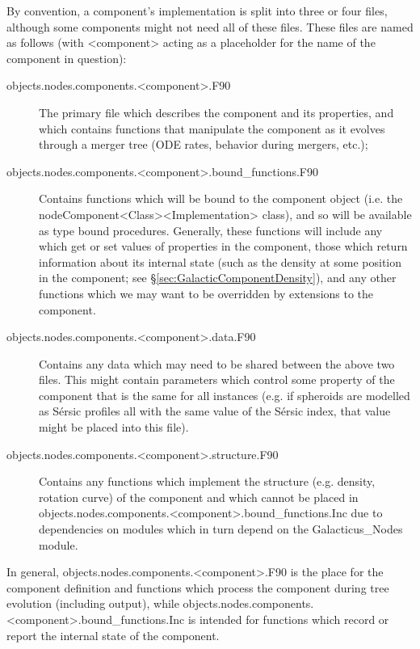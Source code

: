 By convention, a component's implementation is split into three or four files, although some components might not need all of these files. These files are named as follows (with {\normalfont \ttfamily \textless component\textgreater} acting as a placeholder for the name of the component in question):
\begin{description}
 \item [{\normalfont \ttfamily objects.nodes.components.\textless component\textgreater.F90}] The primary file which describes the component and its properties, and which contains functions that manipulate the component as it evolves through a merger tree (ODE rates, behavior during mergers, etc.);
 \item [{\normalfont \ttfamily objects.nodes.components.\textless component\textgreater.bound\_functions.F90}] Contains functions which will be bound to the component object (i.e. the {\normalfont \ttfamily nodeComponent\textless Class\textgreater\textless Implementation\textgreater} class), and so will be available as type bound procedures. Generally, these functions will include any which get or set values of properties in the component, those which return information about its internal state (such as the density at some position in the component; see \S\ref{sec:GalacticComponentDensity}), and any other functions which we may want to be overridden by extensions to the component.
 \item [{\normalfont \ttfamily objects.nodes.components.\textless component\textgreater.data.F90}] Contains any data which may need to be shared between the above two files. This might contain parameters which control some property of the component that is the same for all instances (e.g. if spheroids are modelled as S\'ersic profiles all with the same value of the S\'ersic index, that value might be placed into this file).
 \item [{\normalfont \ttfamily objects.nodes.components.\textless component\textgreater.structure.F90}] Contains any functions which implement the structure (e.g. density, rotation curve) of the component and which cannot be placed in {\normalfont \ttfamily objects.nodes.components.\textless component\textgreater.bound\_functions.Inc} due to dependencies on modules which in turn depend on the {\normalfont \ttfamily Galacticus\_Nodes} module.
\end{description}
In general, {\normalfont \ttfamily objects.nodes.components.\textless component\textgreater.F90} is the place for the component definition and functions which process the component during tree evolution (including output), while {\normalfont \ttfamily objects.nodes.components.\textless component\textgreater.bound\_functions.Inc} is intended for functions which record or report the internal state of the component.


